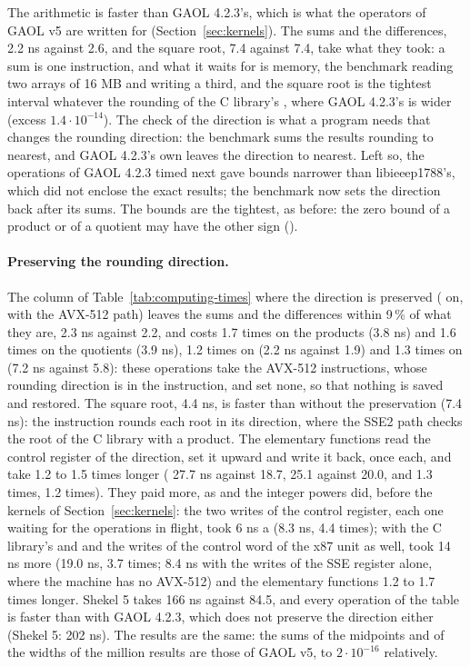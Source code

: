 The arithmetic is faster than GAOL 4.2.3's, which is what the operators of
GAOL v5 are written for (Section~\ref{sec:kernels}). The sums and the
differences, 2.2 ns against 2.6, and the square root, 7.4 against 7.4, take what they took: a sum is one instruction, and what it waits for is memory,
the benchmark reading two arrays of 16 MB and writing a third, and the
square root is the tightest interval whatever the rounding of the C
library's , where GAOL 4.2.3's is wider (excess
$1.4\cdot10^{-14}$). The check of the direction is what a program needs that
changes the rounding direction: the benchmark sums the results rounding to
nearest, and GAOL 4.2.3's own  leaves the direction to
nearest. Left so, the operations of GAOL 4.2.3 timed next gave bounds
narrower than libieeep1788's, which did not enclose the exact results; the
benchmark now sets the direction back after its sums. The bounds are the
tightest, as before: the zero bound of a product or of a quotient may have
the other sign ().

\paragraph{Preserving the rounding direction.}
The column of Table~\ref{tab:computing-times} where the direction is
preserved ( on, with the AVX-512 path)
leaves the sums and the differences within 9\,\% of what they are, 2.3 ns against 2.2, and costs 1.7
times on the products (3.8 ns) and 1.6 times on the quotients (3.9 ns), 1.2 times on
 (2.2 ns against 1.9) and 1.3 times on  (7.2 ns
against 5.8): these operations take the AVX-512 instructions, whose rounding
direction is in the instruction, and set none, so that nothing is saved and
restored. The square root, 4.4 ns, is faster than without the preservation
(7.4 ns): the instruction rounds each root in its direction, where the SSE2
path checks the root of the C library with a product. The elementary
functions read the control register of the direction, set it upward and
write it back, once each, and take 1.2 to 1.5 times longer (
27.7 ns against 18.7,  25.1 against 20.0,  and 
1.3 times,  1.2 times). They paid more, as  and the
integer powers did, before the kernels of Section~\ref{sec:kernels}: the two
writes of the control register, each one waiting for the operations in
flight, took 6 ns a  (8.3 ns, 4.4 times); with the C library's
 and  and the writes of the control
word of the x87 unit as well,  took 14 ns more (19.0 ns, 3.7
times; 8.4 ns with the writes of the SSE register alone, where the machine
has no AVX-512) and the elementary functions 1.2 to 1.7 times longer.
Shekel 5 takes 166 ns against 84.5, and every operation of the table is faster than with GAOL 4.2.3, which does not preserve the direction either (Shekel 5: 202 ns). The results are the same: the sums of the midpoints and
of the widths of the million results are those of GAOL v5, to
$2\cdot10^{-16}$ relatively.

